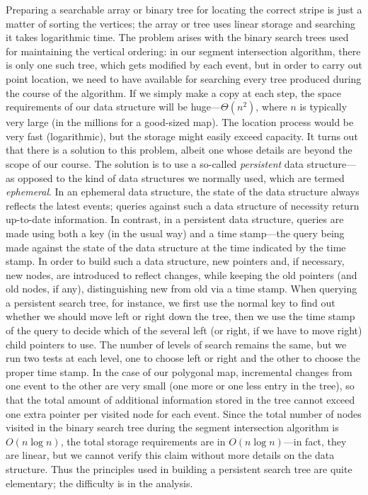 \documentclass[11pt]{article}
\begin{document}
Preparing a searchable array or binary tree for locating the correct stripe
is just a matter of sorting the vertices; the array or tree uses linear storage
and searching it takes logarithmic time.  The problem arises with the binary
search trees used for maintaining the vertical ordering: in our segment
intersection algorithm, there is only one such tree, which gets modified
by each event, but in order to carry out point location, we need to have
available for searching every tree produced during the course of the algorithm.
If we simply make a copy at each step, the space requirements of our data
structure will be huge---$\Theta(n^2)$, where $n$ is typically very large
(in the millions for a good-sized map).   The location process would be
very fast (logarithmic), but the storage might easily exceed capacity.
It turns out that there is a solution to this problem, albeit one whose
details are beyond the scope of our course.  The solution is to use a
so-called \emph{persistent} data structure---as opposed to the kind of
data structures we normally used, which are termed \emph{ephemeral}.
In an ephemeral data structure, the state of the data structure always
reflects the latest events; queries against such a data structure of necessity
return up-to-date information.   In contrast, in a persistent data structure,
queries are made using both a key (in the usual way) and a time stamp---the
query being made against the state of the data structure at the time indicated
by the time stamp.  In order to build such a data structure, new pointers
and, if necessary, new nodes, are introduced to reflect changes, while keeping
the old pointers (and old nodes, if any), distinguishing new from old via a
time stamp.  When querying a persistent search tree, for instance, we first
use the normal key to find out whether we should move left or right down the tree, then we use the time stamp of the query to decide which of the several
left (or right, if we have to move right) child pointers to use.  The number
of levels of search remains the same, but we run two tests at each level, one
to choose left or right and the other to choose the proper time stamp.
In the case of our polygonal map, incremental changes from one event to the
other are very small (one more or one less entry in the tree), so that
the total amount of additional information stored in the tree cannot exceed
one extra pointer per visited node for each event.  Since the total number of
nodes visited in the binary search tree during the segment intersection
algorithm is $O(n\log n)$, the total storage requirements are in $O(n\log
n)$---in fact, they are linear, but we cannot verify this claim without more
details on the data structure.
Thus the principles used in building a persistent search tree are quite
elementary; the difficulty is in the analysis.
\end{document}
